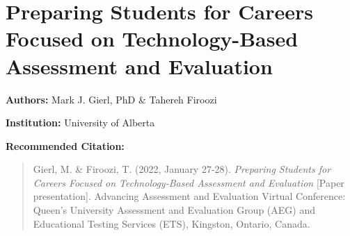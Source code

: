 \documentclass[
]{book}
\begin{document}
\newpage

\hypertarget{preparing-students-for-careers-focused-on-technology-based-assessment-and-evaluation}{%
\section{Preparing Students for Careers Focused on Technology-Based Assessment and Evaluation}\label{preparing-students-for-careers-focused-on-technology-based-assessment-and-evaluation}}

\textbf{Authors:} Mark J. Gierl, PhD \& Tahereh Firoozi

\textbf{Institution:} University of Alberta

\textbf{Recommended Citation:}

\begin{quote}
Gierl, M. \& Firoozi, T. (2022, January 27-28). \emph{Preparing Students for Careers Focused on Technology-Based Assessment and Evaluation} {[}Paper presentation{]}. Advancing Assessment and Evaluation Virtual Conference: Queen's University Assessment and Evaluation Group (AEG) and Educational Testing Services (ETS), Kingston, Ontario, Canada.
\end{quote}
\end{document}
